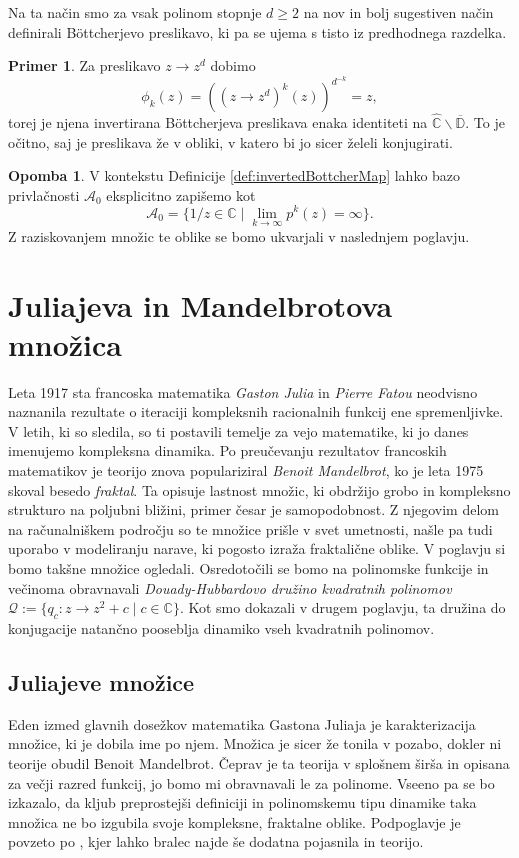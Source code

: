 \documentclass[12pt,a4paper]{amsart}
\theoremstyle{definition} %
\newtheorem{primer}[definicija]{Primer}
\newtheorem{opomba}[definicija]{Opomba}
\theoremstyle{plain} %
\newcommand{\CC}{\mathbb C}
\newcommand{\CCinf} {\hat{\CC}} %
\newcommand{\D}{\mathbb D} %
\newcommand{\QQ}{\mathscr Q} %
\newcommand{\A}{\mathscr A} %
\begin{document}
Na ta način smo za vsak polinom stopnje $d\geq 2$ na nov in bolj sugestiven način definirali B{\"o}ttcherjevo preslikavo, 
ki pa se ujema s tisto iz predhodnega razdelka.

\begin{primer}
Za preslikavo $z\to z^d$ dobimo
$$\phi_k(z) =  \left(\left(z \to z^d\right)^k(z)\right)^{d^{-k}} = z,$$
torej je njena invertirana B{\"o}ttcherjeva preslikava enaka identiteti na $\CCinf\smallsetminus\overline{\D}$.
To je očitno, saj je preslikava že v obliki, v katero bi jo sicer želeli konjugirati.
\end{primer}

\begin{opomba}
V kontekstu Definicije \ref{def:invertedBottcherMap} lahko bazo privlačnosti $\A_0$ eksplicitno zapišemo kot
$$\A_0 = \{1/z \in \CC \mid \lim_{k\to\infty}p^k(z) = \infty\}.$$
Z raziskovanjem množic te oblike se bomo ukvarjali v naslednjem poglavju.
\end{opomba}




\section{Juliajeva in Mandelbrotova množica}
Leta 1917 sta francoska matematika {\em Gaston Julia} in {\em Pierre Fatou} neodvisno naznanila
rezultate o iteraciji kompleksnih racionalnih funkcij ene spremenljivke.
V letih, ki so sledila, so ti postavili temelje za vejo matematike, ki jo danes imenujemo kompleksna dinamika.
Po preučevanju rezultatov francoskih matematikov je teorijo znova populariziral {\em Benoit Mandelbrot}, 
ko je leta 1975 skoval besedo {\em fraktal}.
Ta opisuje lastnost množic, ki obdržijo grobo in kompleksno strukturo na poljubni bližini, primer česar je samopodobnost.
Z njegovim delom na računalniškem področju so te množice prišle v svet umetnosti, 
našle pa tudi uporabo v modeliranju narave, ki pogosto izraža fraktalične oblike.
V poglavju si bomo takšne množice ogledali.
Osredotočili se bomo na polinomske funkcije in večinoma obravnavali 
{\em Douady-Hubbardovo družino kvadratnih polinomov} $\QQ := \{q_c \colon z \to z^2 + c \mid c \in \CC\}$.
Kot smo dokazali v drugem poglavju, ta družina do konjugacije natančno pooseblja dinamiko vseh kvadratnih polinomov.

\subsection{Juliajeve množice}
Eden izmed glavnih dosežkov matematika Gastona Juliaja je karakterizacija množice, ki je dobila ime po njem.
Množica je sicer že tonila v pozabo, dokler ni teorije obudil Benoit Mandelbrot.
Čeprav je ta teorija v splošnem širša in opisana za večji razred funkcij, jo bomo mi obravnavali le za polinome.
Vseeno pa se bo izkazalo, da kljub preprostejši definiciji in polinomskemu tipu dinamike taka množica ne bo izgubila svoje kompleksne, 
fraktalne oblike. Podpoglavje je povzeto po \cite[Poglavje~9]{milnor}, kjer lahko bralec najde še dodatna pojasnila in teorijo.
\end{document}

